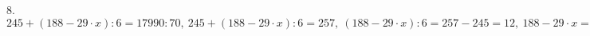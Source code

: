 8. $245+(188-29\cdot x):6=17990:70,\ 245+(188-29\cdot x):6=257,\ (188-29\cdot x):6=257-245=12,\ 188-29\cdot x=6\cdot12=72,\ 29\cdot x=188-72=116,\ x=116:29=4.$\\
